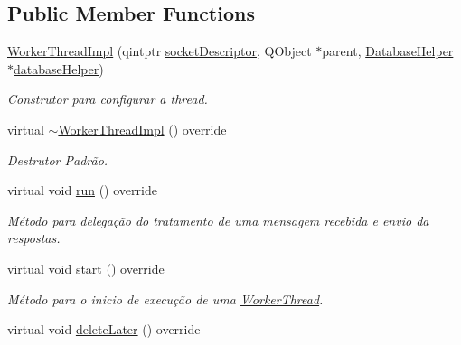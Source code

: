 \subsection*{Public Member Functions}
\begin{DoxyCompactItemize}
\item 
\hyperlink{classWorkerThreadImpl_a61d57c319668cbf86ad1642e8471b6db}{Worker\+Thread\+Impl} (qintptr \hyperlink{classWorkerThreadImpl_af3d6cf4437a92a4dbdf8c07a474a671b}{socket\+Descriptor}, Q\+Object $\ast$parent, \hyperlink{classDatabaseHelper}{Database\+Helper} $\ast$\hyperlink{classWorkerThreadImpl_a6a64f8daf91e56abf94c5a92bfc0fb88}{database\+Helper})
\begin{DoxyCompactList}\small\item\em Construtor para configurar a thread. \end{DoxyCompactList}\item 
virtual \hyperlink{classWorkerThreadImpl_acdb8da302c73c5ab454445029bbe6da1}{$\sim$\+Worker\+Thread\+Impl} () override\hypertarget{classWorkerThreadImpl_acdb8da302c73c5ab454445029bbe6da1}{}\label{classWorkerThreadImpl_acdb8da302c73c5ab454445029bbe6da1}

\begin{DoxyCompactList}\small\item\em Destrutor Padrão. \end{DoxyCompactList}\item 
virtual void \hyperlink{classWorkerThreadImpl_a24ef315ed0b7914ffd099c23a5a6e16c}{run} () override
\begin{DoxyCompactList}\small\item\em Método para delegação do tratamento de uma mensagem recebida e envio da respostas. \end{DoxyCompactList}\item 
virtual void \hyperlink{classWorkerThreadImpl_a16a04e1fd50d1bcb425e70a3ac219786}{start} () override\hypertarget{classWorkerThreadImpl_a16a04e1fd50d1bcb425e70a3ac219786}{}\label{classWorkerThreadImpl_a16a04e1fd50d1bcb425e70a3ac219786}

\begin{DoxyCompactList}\small\item\em Método para o inicio de execução de uma \hyperlink{classWorkerThread}{Worker\+Thread}. \end{DoxyCompactList}\item 
virtual void \hyperlink{classWorkerThreadImpl_a0c7acd90839e238ff12eba997132f532}{delete\+Later} () override\hypertarget{classWorkerThreadImpl_a0c7acd90839e238ff12eba997132f532}{}\label{classWorkerThreadImpl_a0c7acd90839e238ff12eba997132f532}


\end{DoxyCompactItemize}
